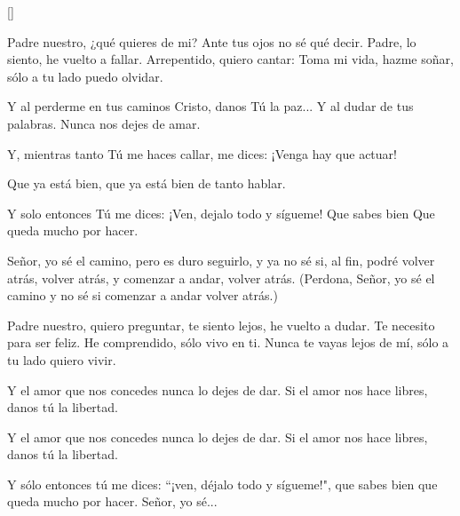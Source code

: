 []
    \beginverse
        \nolyrics{\[Sol Mim Do Re]}
    \endverse

    \juandioff
    \beginverse 
        Padre nuestro, ¿qué quieres de mi?
        Ante tus ojos no sé qué decir.
        Padre, lo siento, he vuelto a fallar.
        Arrepentido, quiero cantar:
        Toma mi vida, hazme soñar,
        sólo a tu lado puedo olvidar.
    \endverse
    \juandion

    \juandioff
    \beginverse
        Y al perderme en tus caminos
        Cristo, danos Tú la paz...
        Y al dudar de tus palabras.
        Nunca nos dejes de amar.
    \endverse
    \juandion

    \juandioff
    \beginverse
        Y, mientras tanto Tú me haces
        callar, me dices:
        ¡Venga hay que actuar!
    \endverse
    \juandion

    \juandioff
    \beginverse
        Que ya está bien,
        que ya está bien de tanto hablar.
    \endverse
    \juandion

    \juandioff
    \beginverse
        Y solo entonces Tú me dices:
        ¡Ven, dejalo todo y sígueme!
        Que sabes bien
        Que queda mucho por hacer.
    \endverse
    \juandion

    \juandioff
    \beginchorus
        Señor, yo sé el camino,
        pero es duro seguirlo,
        y ya no sé si, al fin,
        podré volver atrás,
        volver atrás,
        y comenzar a andar,
        volver atrás.
        (Perdona, Señor, yo sé
        el camino y no sé si
        comenzar a andar
        volver atrás.)
    \endchorus
    \juandion

    \juandioff
    \beginverse
        Padre nuestro, quiero preguntar, te siento lejos, he vuelto a dudar. Te necesito para ser feliz. He comprendido, sólo vivo en ti. Nunca te vayas lejos de mí, sólo a tu lado quiero vivir.
    \endverse
    \juandion

    \juandioff
    \beginverse
        Y el amor que nos concedes nunca lo dejes de dar. Si el amor nos hace libres, danos tú la libertad.
    \endverse
    \juandion

    \juandioff
    \beginverse
        Y el amor que nos concedes nunca lo dejes de dar. Si el amor nos hace libres, danos tú la libertad.
    \endverse
    \juandion

    \juandioff
    \beginverse
        Y sólo entonces tú me dices: “¡ven, déjalo todo y sígueme!", que sabes bien que queda mucho por hacer. Señor, yo sé...
    \endverse
    \juandion
\endsong